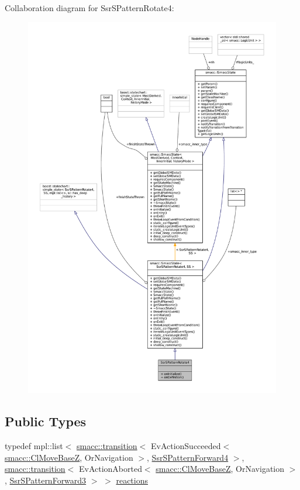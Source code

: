 Collaboration diagram for Ssr\+S\+Pattern\+Rotate4\+:
\nopagebreak
\begin{figure}[H]
\begin{center}
\leavevmode
\includegraphics[width=350pt]{structSsrSPatternRotate4__coll__graph}
\end{center}
\end{figure}
\subsection*{Public Types}
\begin{DoxyCompactItemize}
\item 
typedef mpl\+::list$<$ \hyperlink{classsmacc_1_1transition}{smacc\+::transition}$<$ Ev\+Action\+Succeeded$<$ \hyperlink{classsmacc_1_1ClMoveBaseZ}{smacc\+::\+Cl\+Move\+BaseZ}, Or\+Navigation $>$, \hyperlink{structSsrSPatternForward4}{Ssr\+S\+Pattern\+Forward4} $>$, \hyperlink{classsmacc_1_1transition}{smacc\+::transition}$<$ Ev\+Action\+Aborted$<$ \hyperlink{classsmacc_1_1ClMoveBaseZ}{smacc\+::\+Cl\+Move\+BaseZ}, Or\+Navigation $>$, \hyperlink{structSsrSPatternForward3}{Ssr\+S\+Pattern\+Forward3} $>$ $>$ \hyperlink{structSsrSPatternRotate4_a46fc7fd9c1d25aa9b9ea6c51e31ee211}{reactions}
\end{DoxyCompactItemize}

